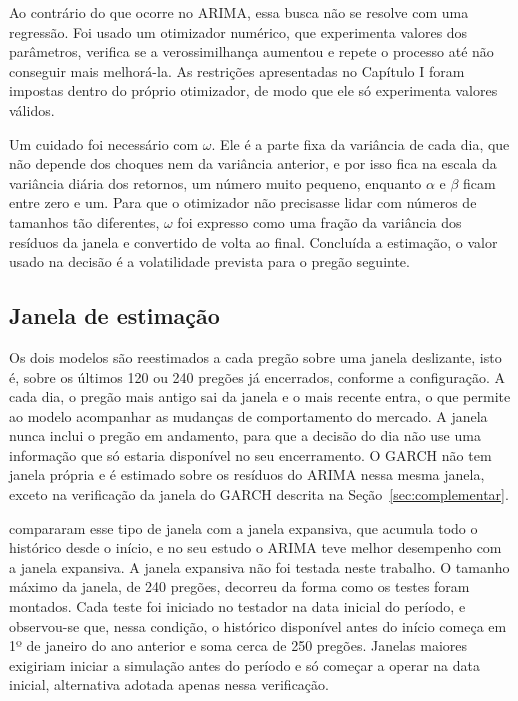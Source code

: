 Ao contrário do que ocorre no ARIMA, essa busca não se resolve com uma regressão.
Foi usado um otimizador numérico, que experimenta valores dos parâmetros, verifica
se a verossimilhança aumentou e repete o processo até não conseguir mais
melhorá-la. As restrições apresentadas no Capítulo I foram impostas dentro do
próprio otimizador, de modo que ele só experimenta valores válidos.

Um cuidado foi necessário com $\omega$. Ele é a parte fixa da variância de cada
dia, que não depende dos choques nem da variância anterior, e por isso fica na
escala da variância diária dos retornos, um número muito pequeno, enquanto $\alpha$
e $\beta$ ficam entre zero e um. Para que o otimizador não precisasse lidar com
números de tamanhos tão diferentes, $\omega$ foi expresso como uma fração da
variância dos resíduos da janela e convertido de volta ao final. Concluída a
estimação, o valor usado na decisão é a volatilidade prevista para o pregão
seguinte.

\subsection{Janela de estimação}

Os dois modelos são reestimados a cada pregão sobre uma janela deslizante, isto é,
sobre os últimos 120 ou 240 pregões já encerrados, conforme a configuração. A cada
dia, o pregão mais antigo sai da janela e o mais recente entra, o que permite ao
modelo acompanhar as mudanças de comportamento do mercado. A janela nunca inclui o
pregão em andamento, para que a decisão do dia não use uma informação que só
estaria disponível no seu encerramento. O GARCH não tem janela própria e é
estimado sobre os resíduos do ARIMA nessa mesma janela, exceto na verificação da
janela do GARCH descrita na Seção~\ref{sec:complementar}.

 compararam esse tipo de janela com a janela expansiva, que
acumula todo o histórico desde o início, e no seu estudo o ARIMA teve melhor
desempenho com a janela expansiva. A janela expansiva não foi testada neste
trabalho. O tamanho máximo da janela, de 240 pregões, decorreu da forma como os
testes foram montados. Cada teste foi iniciado no testador na data inicial do
período, e observou-se que, nessa condição, o histórico disponível antes do início
começa em 1º de janeiro do ano anterior e soma cerca de 250 pregões. Janelas
maiores exigiriam iniciar a simulação antes do período e só começar a operar na
data inicial, alternativa adotada apenas nessa verificação.

